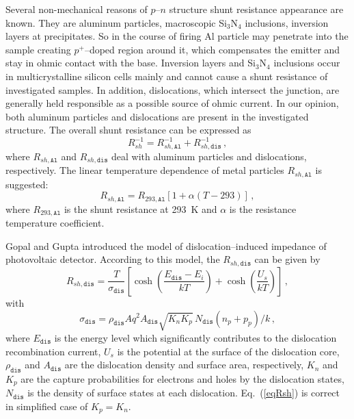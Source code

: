 \documentclass[aip,jap, amsmath,amssymb,reprint]{revtex4-1}
\begin{document}
Several non-mechanical reasons of $p$--$n$ structure shunt resistance appearance are known.\cite{Rsh:Breitenstein}
They are aluminum particles, macroscopic Si$_3$N$_4$ inclusions, inversion layers at precipitates.
So in the course of firing Al particle may penetrate into the sample creating $p^+$--doped region around it, which compensates the emitter and stay in ohmic contact with the
base.
Inversion layers and Si$_3$N$_4$ inclusions occur in multicrystalline silicon cells mainly \cite{Rsh:Breitenstein} and cannot cause a shunt resistance of investigated samples.
In addition, dislocations, which intersect the junction, are generally held responsible as a possible source of ohmic current.\cite{Rsh:Breitenstein,TAT:Gopal,Rsh:Baker}
In our opinion, both aluminum particles and dislocations are present in the investigated structure.
The overall shunt resistance can be expressed as
\begin{equation}
\label{eqRshFull}
R_{sh}^{-1}=R_{sh,\mathtt{Al}}^{-1}+R_{sh,\mathtt{dis}}^{-1}\,,
\end{equation}
where
$R_{sh,\mathtt{Al}}$ and $R_{sh,\mathtt{dis}}$ deal with aluminum particles and dislocations, respectively.
The linear temperature dependence of metal particles $R_{sh,\mathtt{Al}}$ is suggested:
\begin{equation}
\label{eqRshAl}
R_{sh,\mathtt{Al}}=R_{293,\mathtt{Al}}[1+\alpha(T-293)]\,,
\end{equation}
where
$R_{293,\mathtt{Al}}$ is the shunt resistance at 293~K and
$\alpha$ is the resistance temperature coefficient.

Gopal and Gupta \cite{Rsh:Gopal2003,Rsh:Gopal2004} introduced the model of dislocation--induced impedance of photovoltaic detector.
According to this model, the $R_{sh,\mathtt{dis}}$ can be given by
\begin{equation}
\label{eqRsh}
R_{sh,\mathtt{dis}}=\frac{T}{\sigma_{\mathtt{dis}}}\left[\cosh\left(\frac{E_\mathtt{dis}-E_i}{kT}\right)+\cosh\left(\frac{U_s}{kT}\right)\right]\,,
\end{equation}
with
\begin{equation}
\label{eqRdis}
\sigma_{\mathtt{dis}}=\rho_{\mathtt{dis}}Aq^2A_{\mathtt{dis}}\sqrt{K_nK_p}\,N_{\mathtt{dis}}(n_p+p_p)/k\,,
\end{equation}
where
$E_{\mathtt{dis}}$ is the energy level which significantly contributes to the dislocation recombination current,
$U_s$ is the potential at the surface of the dislocation core,
$\rho_{\mathtt{dis}}$ and $A_{\mathtt{dis}}$ are the dislocation density and surface area, respectively,
$K_n$ and $K_p$ are the capture probabilities for electrons and holes by the dislocation states,
$N_{\mathtt{dis}}$ is the density of surface states at each dislocation.
Eq.~(\ref{eqRsh}) is correct in simplified case of $K_p=K_n$.
\end{document}
